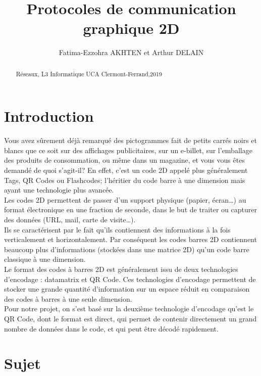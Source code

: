 \documentclass{article}
\begin{document}
\title{Protocoles de communication graphique 2D}
\date{}
\author{Fatima-Ezzohra AKHTEN et Arthur DELAIN}
\maketitle
\begin{abstract}
\begin{center}
Réseaux, L3 Informatique UCA Clermont-Ferrand,2019\\
\end{center}
\end{abstract}
\part*{Introduction}
Vous avez sûrement déjà remarqué des pictogrammes fait de petits carrés noirs et blancs que ce soit sur des affichages publicitaires, sur un e-billet, sur l’emballage des produits de consommation, ou même dans un magazine, et vous vous êtes demandé de quoi s’agit-il? En effet, c’est un code 2D appelé plus généralement Tags, QR Codes ou Flashcodes; l'héritier du code barre à une dimension mais ayant une technologie plus avancée.\\

Les codes 2D permettent de passer d'un support physique (papier, écran…) au format électronique en une fraction de seconde, dans le but de traiter ou capturer des données (URL, mail, carte de visite…).\\

Ils se caractérisent par le fait qu'ils contiennent des informations à la fois verticalement et horizontalement. Par conséquent les codes barres 2D contiennent beaucoup plus d'informations (stockées dans une matrice 2D) qu'un code barre classique à une dimension.\\

 
Le format des codes à barres 2D est généralement issu de deux technologies d'encodage : datamatrix et QR Code. Ces technologies d'encodage permettent de stocker une grande quantité d'information sur un espace réduit en comparaison des codes à barres à une seule dimension. \\

Pour notre projet, on s'est basé sur la deuxième technologie d'encodage qu'est le QR Code, dont le format est direct, qui permet de contenir directement un grand nombre de données dans le code, et qui peut être décodé rapidement.


\part*{Sujet}

\end{document}

